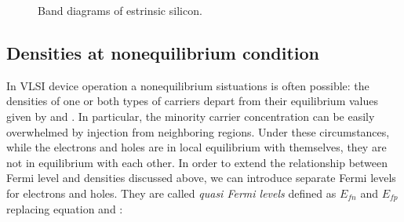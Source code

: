\begin{figure}[!h]
\centering
{}
\caption{Band diagrams of estrinsic silicon.}
\label{fig: Band diagrams of estrinsic silicon}
\end{figure}

\subsection{Densities at nonequilibrium condition}

In VLSI device operation a nonequilibrium sistuations is often possible: the densities of one or both types of carriers depart from their equilibrium values given by  and .
In particular, the minority carrier concentration can be easily overwhelmed by injection from neighboring regions. Under these circumstances, while the electrons and holes are in local equilibrium with themselves, they are not in equilibrium with each other. In order to extend the relationship between Fermi level and densities discussed above, we can introduce separate Fermi levels for electrons and holes. They are called \textit{quasi Fermi levels} defined as $E_{fn}$ and $E_{fp}$ replacing equation  and :

